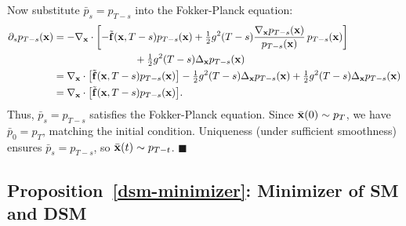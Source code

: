 Now substitute $\bar p_s = p_{T-s}$ into the Fokker-Planck equation:
\begin{align*}
\partial_s p_{T-s}({\mathbf{x}})
&=
-\nabla_{{\mathbf{x}}}\cdot
\biggl[
-\tilde {{\mathbf{f}}}({\mathbf{x}}, T - s)p_{T-s}({\mathbf{x}})
+ \tfrac{1}{2} g^2(T - s)\frac{\nabla_{{\mathbf{x}}}p_{T-s}({\mathbf{x}})}{p_{T-s}({\mathbf{x}})}\,p_{T-s}({\mathbf{x}})
\biggr] \\
&\qquad\qquad\qquad\qquad
+ \tfrac{1}{2} g^2(T - s)\Delta_{{\mathbf{x}}}p_{T-s}({\mathbf{x}}) \\
&=
\nabla_{{\mathbf{x}}}\cdot\bigl[\tilde {{\mathbf{f}}}({\mathbf{x}}, T - s)p_{T-s}({\mathbf{x}})\bigr]
-\tfrac{1}{2} g^2(T - s)\Delta_{{\mathbf{x}}}p_{T-s}({\mathbf{x}})
+\tfrac{1}{2} g^2(T - s)\Delta_{{\mathbf{x}}}p_{T-s}({\mathbf{x}}) \\
&=
\nabla_{{\mathbf{x}}}\cdot\bigl[\tilde {{\mathbf{f}}}({\mathbf{x}}, T - s)p_{T-s}({\mathbf{x}})\bigr].
\end{align*}
Thus, $\bar p_s = p_{T-s}$ satisfies the Fokker-Planck equation. Since $\bar{{\mathbf{x}}}(0) \sim p_T$, we have $\bar p_0 = p_T$, matching the initial condition. Uniqueness (under sufficient smoothness) ensures $\bar p_s = p_{T-s}$, so $\bar{{\mathbf{x}}}(t) \sim p_{T-t}$.
\hfill$\blacksquare$


\subsection{Proposition~\ref{dsm-minimizer}: Minimizer of SM and DSM}\label{app-sec:min-dsm}

